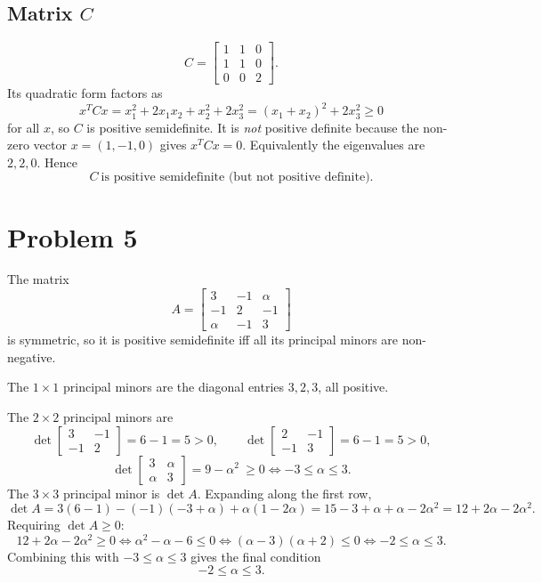 \documentclass[UTF8,a4paper,12pt]{ctexart}
\begin{document}
\subsection*{Matrix $C$}
\[
C=\begin{bmatrix}
1 & 1 & 0\\
1 & 1 & 0\\
0 & 0 & 2
\end{bmatrix}.
\]
Its quadratic form factors as
\[
x^TCx=x_1^2+2x_1x_2+x_2^2+2x_3^2=(x_1+x_2)^2+2x_3^2\ge0
\]
for all $x$, so $C$ is positive semidefinite. It is \emph{not} positive definite
because the non-zero vector $x=(1,-1,0)$ gives $x^TCx=0$. Equivalently the
eigenvalues are $2,2,0$. Hence
\[
\boxed{C\ \text{is positive semidefinite (but not positive definite).}}
\]

\section*{Problem 5}

The matrix
\[
A=\begin{bmatrix}
3 & -1 & \alpha\\
-1 & 2 & -1\\
\alpha & -1 & 3
\end{bmatrix}
\]
is symmetric, so it is positive semidefinite iff all its principal minors are
non-negative.

The $1\times1$ principal minors are the diagonal entries $3,2,3$, all positive.

The $2\times2$ principal minors are
\[
\det\begin{bmatrix}3&-1\\-1&2\end{bmatrix}=6-1=5>0,
\qquad
\det\begin{bmatrix}2&-1\\-1&3\end{bmatrix}=6-1=5>0,
\]
\[
\det\begin{bmatrix}3&\alpha\\\alpha&3\end{bmatrix}=9-\alpha^2\ \ge0
\iff -3\le\alpha\le3 .
\]
The $3\times3$ principal minor is $\det A$. Expanding along the first row,
\[
\det A
=3(6-1)-(-1)(-3+\alpha)+\alpha(1-2\alpha)
=15-3+\alpha+\alpha-2\alpha^2
=12+2\alpha-2\alpha^2 .
\]
Requiring $\det A\ge0$:
\[
12+2\alpha-2\alpha^2\ge0
\iff \alpha^2-\alpha-6\le0
\iff (\alpha-3)(\alpha+2)\le0
\iff -2\le\alpha\le3 .
\]
Combining this with $-3\le\alpha\le3$ gives the final condition
\[
\boxed{-2\le\alpha\le3 .}
\]
\end{document}

